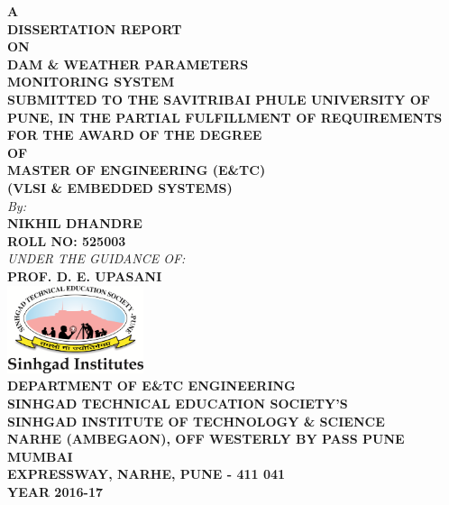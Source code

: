 \documentclass[a4paper,12pt]{report}
\def\title{DAM \& WEATHER PARAMETERS\\[.3CM] MONITORING SYSTEM}
\def\REPORT{DISSERTATION REPORT} %
\def\DEPT{DEPARTMENT OF E\&TC ENGINEERING}
\def\DG{MASTER OF ENGINEERING (E\&TC)}
\def\BRANCH{VLSI \& EMBEDDED SYSTEMS}
\def\AUTHOR{NIKHIL DHANDRE}
\def\rollno{525003}
\def\GUIDE{PROF. D. E. UPASANI}
\def\COLLEGE{SINHGAD INSTITUTE OF TECHNOLOGY \& SCIENCE}
\def\UNI{SAVITRIBAI PHULE UNIVERSITY OF PUNE}
\begin{document}

\newcommand{\HRule}{\rule{\linewidth}{0.5mm}} %
\renewcommand\bibname{References}

\begin{titlepage}
\thispagestyle{empty}
\begin{center}
\textbf{A \\[.2cm] \REPORT \\[.2cm] ON}
\\[.3cm]
\textbf{\LARGE \title }
\\[.3cm]
\textbf{SUBMITTED TO THE \UNI, IN
THE PARTIAL FULFILLMENT OF REQUIREMENTS FOR THE
AWARD OF THE DEGREE \\[.2cm] OF }
\\[.2cm]
\textbf{\Large \DG \\[.2cm] (\BRANCH)}
\\[.3cm]
\emph{By:}
\\[.2cm]
\textbf{\large \AUTHOR}
\\
\textbf{ROLL NO: \rollno}
\\[.5cm]

\emph{UNDER THE GUIDANCE OF:}
\\[.2cm]
\textbf{\large \GUIDE}
\\[1.5cm]
\includegraphics[width=4cm]{figures/scoe_logo.png}
\\[1.5cm]

\textbf{\Large \DEPT} 
\\[.3cm]
\textbf{SINHGAD TECHNICAL EDUCATION SOCIETY’S}
\\[.2cm]
\textbf{\Large \COLLEGE}
\\[.3cm]
\textbf{NARHE (AMBEGAON), OFF WESTERLY BY PASS PUNE MUMBAI
\\ EXPRESSWAY, NARHE, PUNE - 411 041} \\[1cm]
\textbf{\Large YEAR 2016-17} 
\end{center}
\clearpage
\restoregeometry
\end{titlepage}
\end{document}
